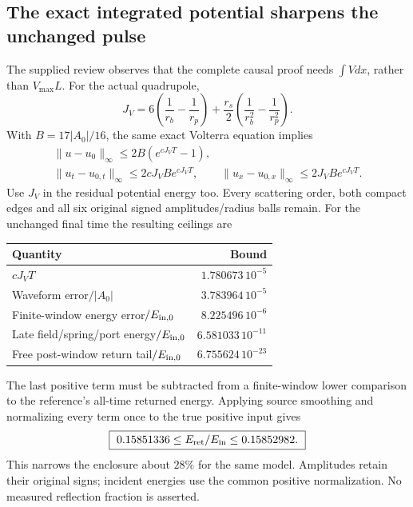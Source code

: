 \documentclass[10pt,twocolumn,letterpaper]{article}
\begin{document}
\subsection{The exact integrated potential sharpens the unchanged pulse}
The supplied review observes that the complete causal proof needs
$\int Vdx$, rather than $V_{\max}L$. For the actual quadrupole,
\begin{equation}
 J_V=6\left(\frac1{r_b}-\frac1{r_p}\right)
       +\frac{r_s}{2}\left(\frac1{r_b^2}-\frac1{r_p^2}\right).
 \label{eq:li-JV}
\end{equation}
With $B=17|A_0|/16$, the same exact Volterra equation implies
\begin{equation}
\begin{gathered}
 \|u-u_0\|_\infty\leq2B(e^{cJ_VT}-1),\\
 \|u_t-u_{0,t}\|_\infty\leq2cJ_VBe^{cJ_VT},\qquad
 \|u_x-u_{0,x}\|_\infty\leq2J_VBe^{cJ_VT}.
\end{gathered}
\end{equation}
Use $J_V$ in the residual potential energy too. Every scattering order,
both compact edges and all six original signed amplitudes/radius balls
remain. For the unchanged final time the resulting ceilings are
\begin{center}
\small
\begin{tabular}{lr}
\hline
Quantity & Bound\\\hline
$cJ_VT$ & $1.780673\,10^{-5}$\\
Waveform error$/|A_0|$ & $3.783964\,10^{-5}$\\
Finite-window energy error$/E_{{\rm in},0}$ & $8.225496\,10^{-6}$\\
Late field/spring/port energy$/E_{{\rm in},0}$ & $6.581033\,10^{-11}$\\
Free post-window return tail$/E_{{\rm in},0}$ & $6.755624\,10^{-23}$\\\hline
\end{tabular}
\end{center}
The last positive term must be subtracted from a finite-window lower
comparison to the reference's all-time returned energy. Applying source
smoothing and normalizing every term once to the true positive input gives
\begin{equation}
 \boxed{\ 0.15851336\leq E_{\rm ret}/E_{\rm in}\leq0.15852982.\ }
 \label{eq:li-tight-return}
\end{equation}
This narrows the enclosure about $28\%$ for the same model. Amplitudes
retain their original signs; incident energies use the common positive
normalization. No measured reflection fraction is asserted.
\end{document}

